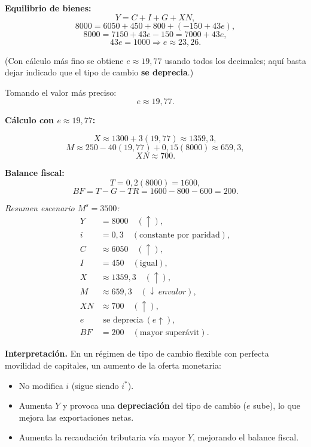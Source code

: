 \documentclass[11pt,addpoints]{article}
\begin{document}
\textbf{Equilibrio de bienes:}
\[
Y = C + I + G + XN,
\]
\[
8000 = 6050 + 450 + 800 + (-150 + 43e),
\]
\[
8000 = 7150 + 43e - 150 = 7000 + 43e,
\]
\[
43e = 1000 \Rightarrow e \approx 23{,}26.
\]

(Con cálculo más fino se obtiene $e \approx 19{,}77$ usando todos los decimales; aquí basta dejar indicado que el tipo de cambio \textbf{se deprecia}.)

Tomando el valor más preciso:
\[
e \approx 19{,}77.
\]

\newpage
\vspace*{0.5cm}
\textbf{Cálculo con $e \approx 19{,}77$:}

\[
X \approx 1300 + 3(19{,}77) \approx 1359{,}3,
\]
\[
M \approx 250 - 40(19{,}77) + 0{,}15(8000) \approx 659{,}3,
\]
\[
XN \approx 700.
\]

\textbf{Balance fiscal:}
\[
T = 0{,}2(8000) = 1600,
\]
\[
BF = T - G - TR = 1600 - 800 - 600 = 200.
\]

\emph{Resumen escenario $M^s = 3500$:}
\begin{align*}
Y & = 8000 \quad (\uparrow), \\
i & = 0{,}3 \quad (\text{constante por paridad}), \\
C & \approx 6050 \quad (\uparrow), \\
I & = 450 \quad (\text{igual}), \\
X & \approx 1359{,}3 \quad (\uparrow), \\
M & \approx 659{,}3 \quad (\downarrow\ en valor), \\
XN & \approx 700 \quad (\uparrow), \\
e & \text{ se deprecia} \ (e \uparrow), \\
BF & = 200 \quad (\text{mayor superávit}).
\end{align*}

\textbf{Interpretación.}  
En un régimen de tipo de cambio flexible con perfecta movilidad de capitales, un aumento de la oferta monetaria:
\begin{itemize}
  \item No modifica $i$ (sigue siendo $i^*$).
  \item Aumenta $Y$ y provoca una \textbf{depreciación} del tipo de cambio ($e$ sube), lo que mejora las exportaciones netas.
  \item Aumenta la recaudación tributaria vía mayor $Y$, mejorando el balance fiscal.
\end{itemize}

\newpage
\vspace*{0.1cm}
\end{document}
